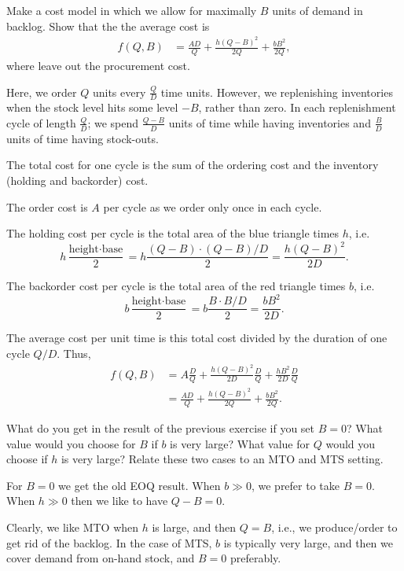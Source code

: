 \begin{exercise}
  Make a cost model in which we allow for maximally $B$ units of demand in backlog. Show that 
the the average cost is 
\begin{align*}
f(Q,B) 
&= \frac{AD}{Q} + \frac{h(Q-B)^2}{2Q} + \frac{bB^2}{2Q},
\end{align*}
where leave out the procurement cost.
  \begin{solution}

Here, we order $Q$ units every $\frac{Q}{D}$ time units. However, we replenishing inventories when the stock level hits some level $-B$, rather than zero. In each replenishment cycle of length $\frac{Q}{D}$; we spend $\frac{Q-B}{D}$ units of time while having inventories and $\frac{B}{D}$ units of time having stock-outs. 


The total cost for one cycle is the sum of the ordering cost and the inventory (holding and backorder) cost. 

The order cost is $A$ per cycle as we order only once in each cycle. 

The holding cost per cycle is the total area of the blue triangle times $h$, i.e. 
\begin{equation*}
h \frac{\text{height}\cdot\text{base}}{2} = h \frac{(Q-B) \cdot (Q-B)/D}{2} = \frac{h(Q-B)^2}{2D}.
\end{equation*}

The backorder cost per cycle is the total area of the red triangle times $b$, i.e. 
\begin{equation*}
b \frac{\text{height}\cdot\text{base}}{2} = b \frac{B \cdot B/D}{2} = \frac{b B^2}{2D}.
\end{equation*}

The average cost per unit time is this total cost divided by the duration of one cycle $Q/D$. Thus, 
\begin{align*}
f(Q,B) 
&= A \frac{D}{Q} + \frac{h(Q-B)^2}{2D} \frac{D}{Q} + \frac{hB^2}{2D} \frac{D}{Q} \\
&= \frac{AD}{Q} + \frac{h(Q-B)^2}{2Q} + \frac{bB^2}{2Q}.
\end{align*}

\end{solution}
\end{exercise}

\begin{exercise}
What do you get in the result of the previous exercise if you set $B=0$? What value would you choose for $B$ if $b$ is very large? What value for $Q$ would you choose if $h$ is very large? Relate these two cases to an MTO and MTS setting.
  \begin{solution}
For $B=0$  we get the old EOQ result. When $b\gg 0$, we prefer to take $B=0$. When $h\gg0$ then we like to have $Q-B=0$. 

Clearly, we like MTO when $h$ is large, and then $Q=B$, i.e., we produce/order to get rid of the backlog. In the case of MTS, $b$ is typically very large, and then we cover demand from on-hand stock, and $B=0$ preferably.
\end{solution}
\end{exercise}




